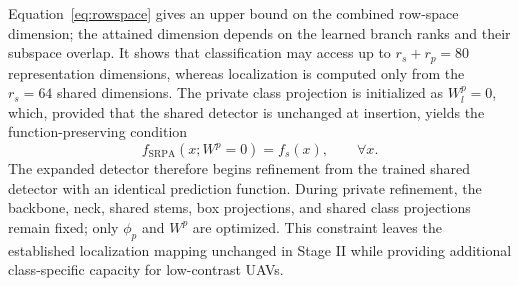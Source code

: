 Equation~\eqref{eq:rowspace} gives an upper bound on the combined row-space dimension; the attained dimension depends on the learned branch ranks and their subspace overlap. It shows that classification may access up to $r_s+r_p=80$ representation dimensions, whereas localization is computed only from the $r_s=64$ shared dimensions. The private class projection is initialized as $W_l^p=0$, which, provided that the shared detector is unchanged at insertion, yields the function-preserving condition
\begin{equation}
f_{\mathrm{SRPA}}(x;W^p=0)=f_s(x),\qquad \forall x.
\label{eq:identity}
\end{equation}
The expanded detector therefore begins refinement from the trained shared detector with an identical prediction function. During private refinement, the backbone, neck, shared stems, box projections, and shared class projections remain fixed; only $\phi_p$ and $W^p$ are optimized. This constraint leaves the established localization mapping unchanged in Stage II while providing additional class-specific capacity for low-contrast UAVs.

